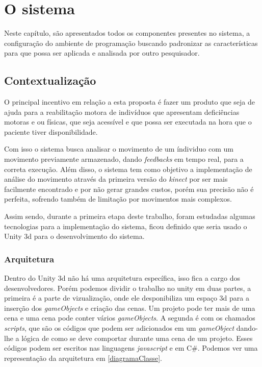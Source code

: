 \chapter[O sistema]{O sistema}
Neste capítulo, são apresentados todos os componentes presentes no sistema,
 a configuração do ambiente de programação buscando padronizar as características para que possa ser aplicada e analisada por outro pesquisador.

\section{Contextualização}
  O principal incentivo em relação a esta proposta é fazer um produto que seja de ajuda
para a reabilitação motora  de indivíduos que apresentam deficiências motoras e ou físicas, que seja acessível e
que possa ser executada na hora que o paciente tiver disponibilidade.

  Com isso o sistema busca analisar o movimento de um índividuo com um movimento previamente
armazenado, dando \textit{feedbacks} em tempo real, para a correta execução. Além disso,
o sistema tem como objetivo a implementação de análise do movimento através da primeira
versão do \textit{kinect} por ser mais facilmente encontrado e por não gerar grandes custos, porém
sua precisão não é perfeita, sofrendo também de limitação por movimentos mais complexos.

Assim sendo, durante a primeira etapa deste trabalho,  foram estudadas algumas tecnologias para a implementação do sistema,
 ficou definido que seria usado o Unity 3d para o desenvolvimento do sistema.

\subsection{Arquitetura}\label{sub:arquitetura}
  Dentro do Unity 3d não há uma arquitetura específica, isso fica a cargo dos desenvolvedores. Porém podemos dividir o trabalho no unity em duas partes,
a primeira é a parte de vizualização, onde ele desponibiliza um espaço 3d para a inserção dos \textit{gameObjects} e criação das cenas. Um projeto pode
ter mais de uma cena e uma cena pode conter vários \textit{gameObjects}. A segunda é com os chamados \textit{scripts}, que são os códigos que podem
ser adicionados em um \textit{gameObject} dando-lhe a lógica de como se deve comportar durante uma cena de um projeto. Esses códigos podem ser escritos
nas linguagens \textit{javascript} e em C\#. Podemos ver uma representação da arquitetura em \ref{diagramaClasse}.


